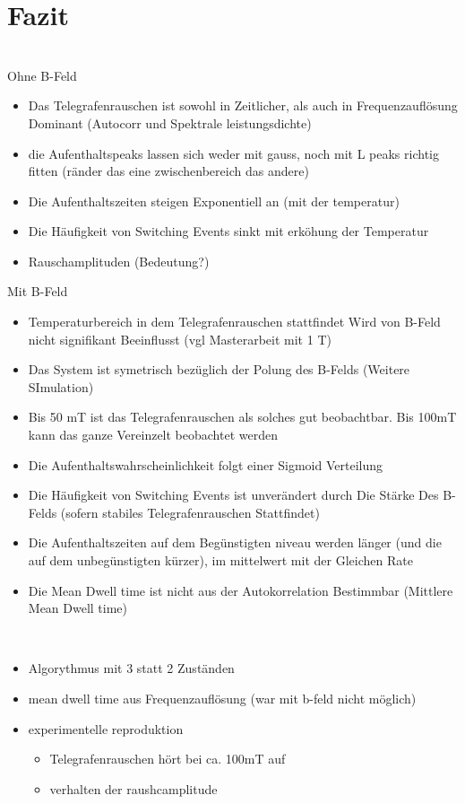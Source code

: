 \documentclass[main.tex]{subfiles}
\begin{document}
\newpage
\section{Fazit}

\\
Ohne B-Feld
\begin{itemize}
    \item Das Telegrafenrauschen ist sowohl in Zeitlicher, als auch in Frequenzauflösung Dominant (Autocorr und Spektrale leistungsdichte)
    \item die Aufenthaltspeaks lassen sich weder mit gauss, noch mit L peaks richtig fitten (ränder das eine zwischenbereich das andere)
    \item Die Aufenthaltszeiten steigen Exponentiell an (mit der temperatur)
    \item Die Häufigkeit von Switching Events sinkt mit erköhung der Temperatur
    \item Rauschamplituden (Bedeutung?)
\end{itemize}

Mit B-Feld
\begin{itemize}
    \item Temperaturbereich in dem Telegrafenrauschen stattfindet Wird von B-Feld nicht signifikant Beeinflusst (vgl Masterarbeit mit 1 T)
    \item Das System ist symetrisch bezüglich der Polung des B-Felds (Weitere SImulation)
    \item Bis 50 mT ist das Telegrafenrauschen als solches gut beobachtbar. Bis 100mT kann das ganze Vereinzelt beobachtet werden
    \item Die Aufenthaltswahrscheinlichkeit folgt einer Sigmoid Verteilung
    \item Die Häufigkeit von Switching Events ist unverändert durch Die Stärke Des B-Felds (sofern stabiles Telegrafenrauschen Stattfindet)
    \item Die Aufenthaltszeiten auf dem Begünstigten niveau werden länger (und die auf dem unbegünstigten kürzer), im mittelwert mit der Gleichen Rate
    \item Die Mean Dwell time ist nicht aus der Autokorrelation Bestimmbar (Mittlere Mean Dwell time)
\end{itemize}
\\
\begin{itemize}
    \item Algorythmus mit 3 statt 2 Zuständen
    \item mean dwell time aus Frequenzauflösung (war mit b-feld nicht möglich)
    \item experimentelle reproduktion 
    \begin{itemize}
        \item Telegrafenrauschen hört bei ca. 100mT auf
        \item verhalten der raushcamplitude
    \end{itemize}
\end{itemize}
\end{document}
